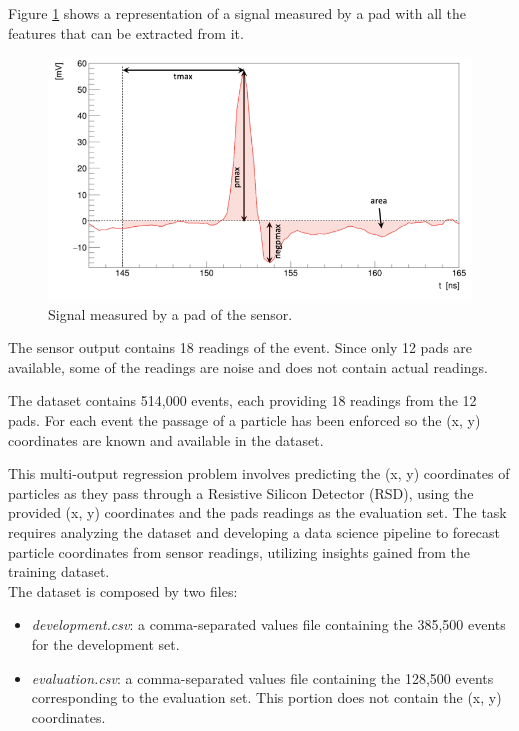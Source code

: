 \documentclass[conference]{IEEEtran}
\begin{document}
Figure \ref{fig:sensor_reading} shows a representation of a signal measured by a pad with all the features 
that can be extracted from it.\\
\begin{figure}[htbp]
\centerline{\includegraphics[width=\linewidth]{media/sensor_signal.png}}
\caption{Signal measured by a pad of the sensor.}
\label{fig:sensor_reading}
\end{figure}

The sensor output contains 18 readings of the event. Since only 12 pads are available, some of the 
readings are noise and does not contain actual readings.

The dataset contains 514,000 events, each providing 18 readings from the 12 pads. 
For each event the passage of a particle has been enforced so the (x, y) coordinates are known and 
available in the dataset.

This multi-output regression problem involves predicting the (x, y) coordinates of particles as they 
pass through a Resistive Silicon Detector (RSD), using the provided (x, y) coordinates and the 
pads readings as the evaluation set. 
The task requires analyzing the dataset and developing a data science pipeline to forecast particle 
coordinates from sensor readings, utilizing insights gained from the training dataset.\\

The dataset is composed by two files:
\begin{itemize}
    \item \textit{development.csv}: a comma-separated values file containing the 385,500 events 
    for the development set.
    \item \textit{evaluation.csv}: a comma-separated values file containing the 128,500 events 
    corresponding to the evaluation set. 
    This portion does not contain the (x, y) coordinates.
\end{itemize}
\end{document}
